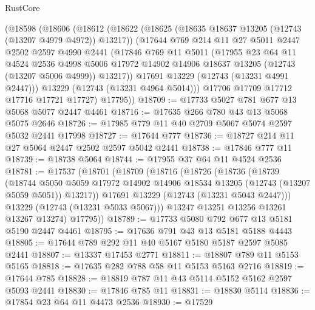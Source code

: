 \begin{lexlean}{RustCore}
\begin{coremodule}
    (@18598
      (@18606
        (@18612
          (@18622
            (@18625 (@18635 @18637 @13205 (@12743 (@13207 @4979 @4972)) @13217))
            (@17644
              @769
              @214
              @11
              @27
              @5011
              @2447
              @2502
              @2597
              @4990
              @2441
              (@17846
                @769
                @11
                @5011
                (@17955
                  @23
                  @64
                  @11
                  @4524
                  @2536
                  @4998
                  @5006
                  @17972
                  @14902
                  @14906
                  @18637
                  @13205
                  (@12743 (@13207 @5006 @4999))
                  @13217))
              @17691
              @13229
              (@12743 (@13231 @4991 @2447)))
            @13229
            (@12743 (@13231 @4964 @5014)))
          @17706
          @17709
          @17712
          @17716
          @17721
          @17727)
        @17795))
@18709 := @17733 @5027 @781 @677 @13 @5068 @5077 @2447 @4461
@18716 := @17635 @266 @780 @43 @13 @5068 @5075 @2646
@18726 := @17985 @779 @11 @40 @2709 @5067 @5074 @2597 @5032 @2441 @17998
@18727 := @17644 @777
@18736 := @18727 @214 @11 @27 @5064 @2447 @2502 @2597 @5042 @2441
@18738 := @17846 @777 @11
@18739 := @18738 @5064
@18744 := @17955 @37 @64 @11 @4524 @2536
@18781 := @17537
    (@18701
      (@18709
        (@18716
          (@18726
            (@18736
              (@18739
                (@18744
                  @5050
                  @5059
                  @17972
                  @14902
                  @14906
                  @18534
                  @13205
                  (@12743 (@13207 @5059 @5051))
                  @13217))
              @17691
              @13229
              (@12743 (@13231 @5043 @2447)))
            @13229
            (@12743 (@13231 @5033 @5067)))
          @13247
          @13251
          @13256
          @13261
          @13267
          @13274)
        @17795))
@18789 := @17733 @5080 @792 @677 @13 @5181 @5190 @2447 @4461
@18795 := @17636 @791 @43 @13 @5181 @5188 @4443
@18805 := @17644 @789 @292 @11 @40 @5167 @5180 @5187 @2597 @5085 @2441
@18807 := @13337 @17453 @2771
@18811 := @18807 @789 @11 @5153 @5165
@18818 := @17635 @282 @788 @58 @11 @5153 @5163 @2716
@18819 := @17644 @785
@18828 := @18819 @787 @11 @43 @5114 @5152 @5162 @2597 @5093 @2441
@18830 := @17846 @785 @11
@18831 := @18830 @5114
@18836 := @17854 @23 @64 @11 @4473 @2536
@18930 := @17529

\end{coremodule}
\end{lexlean}
